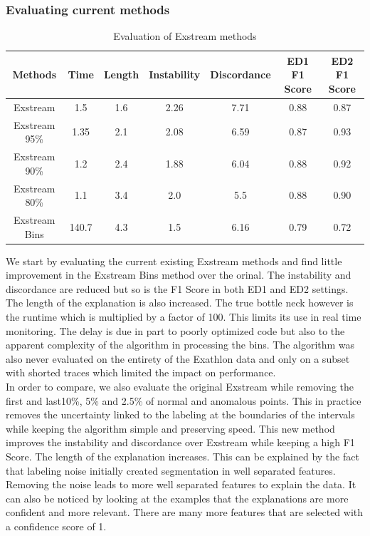 \documentclass[oneside, a4paper, onecolumn, 11pt]{article}
\begin{document}
\subsubsection{Evaluating current methods}
\begin{table}[h]
  \centering
  \begin{tabular}{|c|c|c|c|c|c|c|}
      \hline
      Methods & Time & Length & Instability & Discordance & ED1 F1 Score & ED2 F1 Score\\ 
      \hline
      Exstream  & 1.5  & 1.6  & 2.26  & 7.71 & 0.88 & 0.87  \\ 
      Exstream 95\%  & 1.35  & 2.1  & 2.08  & 6.59 & 0.87 & 0.93\\ 
      Exstream 90\%  & 1.2  & 2.4  & 1.88  & 6.04 & 0.88 & 0.92\\ 
      Exstream 80\% & 1.1 & 3.4 & 2.0 & 5.5 & 0.88 & 0.90 \\
      Exstream Bins  & 140.7  & 4.3  & 1.5  & 6.16 & 0.79 & 0.72 \\ 
      \hline
  \end{tabular}
  \caption{Evaluation of Exstream methods}
  \label{tab:example}
\end{table}
We start by evaluating the current existing Exstream methods and find little improvement in the Exstream Bins method over the orinal. The instability and discordance are reduced but so is the F1 Score in both ED1 and ED2 settings. The length of the explanation is also increased. The true bottle neck however is the runtime which is multiplied by a factor of 100. This limits its use in real time monitoring. The delay is due in part to poorly optimized code but also to the apparent complexity of the algorithm in processing the bins. The algorithm was also never evaluated on the entirety of the Exathlon data and only on a subset with shorted traces which limited the impact on performance.\\ 
In order to compare, we also evaluate the original Exstream while removing the first and last10\%, 5\% and 2.5\% of normal and anomalous points. This in practice removes the uncertainty linked to the labeling at the boundaries of the intervals while keeping the algorithm simple and preserving speed. This new method improves the instability and discordance over Exstream while keeping a high F1 Score. The length of the explanation increases. This can be explained by the fact that labeling noise initially created segmentation in well separated features. Removing the noise leads to more well separated features to explain the data.  It can also be noticed by looking at the examples that the explanations are more confident and more relevant. There are many more features that are selected with a confidence score of 1. \\
\end{document}
